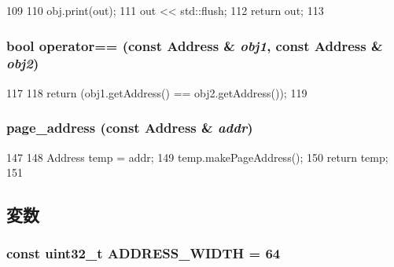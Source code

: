 \begin{DoxyCode}
109 {
110     obj.print(out);
111     out << std::flush;
112     return out;
113 }
\end{DoxyCode}
\hypertarget{Address_8hh_ad0cb56c920b72501175cf194c5624980}{
\subsubsection[{operator==}]{\setlength{\rightskip}{0pt plus 5cm}bool operator== (const {\bf Address} \& {\em obj1}, \/  const {\bf Address} \& {\em obj2})}}
\label{Address_8hh_ad0cb56c920b72501175cf194c5624980}



\begin{DoxyCode}
117 {
118     return (obj1.getAddress() == obj2.getAddress());
119 }
\end{DoxyCode}
\hypertarget{Address_8hh_a5169a800da4ecad8ccc7eb6731094ef7}{
\subsubsection[{page\_\-address}]{ page\_\-address (const {\bf Address} \& {\em addr})}}
\label{Address_8hh_a5169a800da4ecad8ccc7eb6731094ef7}



\begin{DoxyCode}
147 {
148     Address temp = addr;
149     temp.makePageAddress();
150     return temp;
151 }
\end{DoxyCode}


\subsection{変数}
\hypertarget{Address_8hh_aa4ec36f84d22eb1b4ccaf88f057dbd5e}{
\subsubsection[{ADDRESS\_\-WIDTH}]{\setlength{\rightskip}{0pt plus 5cm}const {\bf uint32\_\-t} {\bf ADDRESS\_\-WIDTH} = 64}}
\label{Address_8hh_aa4ec36f84d22eb1b4ccaf88f057dbd5e}
